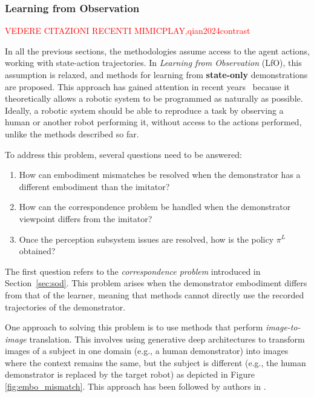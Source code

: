 \subsubsection{Learning from Observation}
\textcolor{red}{VEDERE CITAZIONI RECENTI MIMICPLAY,qian2024contrast}

\label{sec:lfo}
In all the previous sections, the methodologies assume access to the agent actions, working with state-action trajectories. In \textit{Learning from Observation} (LfO), this assumption is relaxed, and methods for learning from \textbf{state-only} demonstrations are proposed. This approach has gained attention in recent years~\cite{torabi2019recent_advances_lfo} because it theoretically allows a robotic system to be programmed as naturally as possible. Ideally, a robotic system should be able to reproduce a task by observing a human or another robot performing it, without access to the actions performed, unlike the methods described so far.

To address this problem, several questions need to be answered:

\begin{enumerate}
\item How can embodiment mismatches be resolved when the demonstrator has a different embodiment than the imitator?
\item How can the correspondence problem be handled when the demonstrator viewpoint differs from the imitator?
\item Once the perception subsystem issues are resolved, how is the policy $\pi^{L}$ obtained?
\end{enumerate}

The first question refers to the \textit{correspondence problem} introduced in Section~\ref{sec:sod}. This problem arises when the demonstrator embodiment differs from that of the learner, meaning that methods cannot directly use the recorded trajectories of the demonstrator.

One approach to solving this problem is to use methods that perform \textit{image-to-image} translation. This involves using generative deep architectures to transform images of a subject in one domain (e.g., a human demonstrator) into images where the context remains the same, but the subject is different (e.g., the human demonstrator is replaced by the target robot) as depicted in Figure \ref{fig:embo_mismatch}. This approach has been followed by authors in \cite{smith2019avid,xiong2021learning_by_watching,li2021meta_watching_video_demonstration}.


